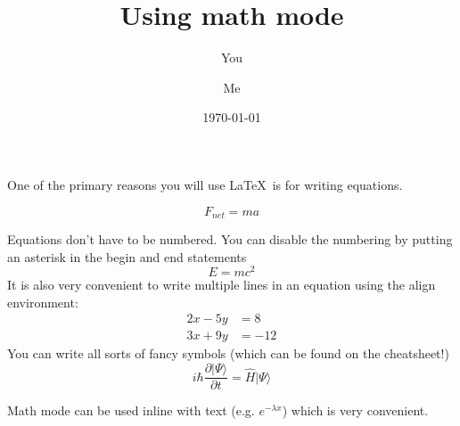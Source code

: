 \documentclass[a4paper]{article}
\begin{document}
\title{Using math mode}
\author{You \and Me}
\date{\today}
\maketitle

One of the primary reasons you will use \LaTeX \ is for writing equations.  

\begin{equation}
F_{net}=ma
\end{equation}

Equations don't have to be numbered. You can disable the numbering by putting an asterisk in the begin and end statements 
\begin{equation*}
E=mc^{2}
\end{equation*}
It is also very convenient to write multiple lines in an equation using the align environment:
\begin{align*}
2x - 5y &=  8 \\ 
3x + 9y &=  -12
\end{align*}
You can write all sorts of fancy symbols (which can be found on the cheatsheet!)
\begin{equation*}
i\hbar \frac{\partial | \Psi \rangle}{ \partial t}=\hat{H}|\Psi \rangle
\end{equation*}

Math mode can be used inline with text (e.g. $e^{-\lambda x}$) which is very convenient. 
\end{document}
